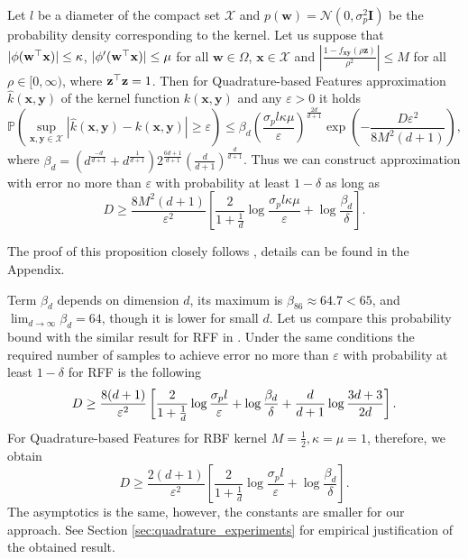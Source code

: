 \begin{proposition}
\label{prop:error_probability_bound}
Let $l$ be a diameter of the compact set $\mathcal{X}$ and
$p(\mathbf{w}) = \mathcal{N}(0, \sigma_p^2 \mathbf{I})$ be the probability density
corresponding to the kernel.
Let us suppose that $|\phi(\mathbf{w}^{\top}\mathbf{x})| \leq \kappa$,
$|\phi'(\mathbf{w}^{\top} \mathbf{x})| \leq \mu$ for all $\mathbf{w} \in \Omega$,
$\mathbf{x} \in \mathcal{X}$ and
$\left |\frac{1 - f_{\mathbf{xy}}(\rho \mathbf{z})}{\rho^2} \right | \leq M$ for all $\rho \in [0, \infty)$, where $\mathbf{z}^{\top}\mathbf{z} = 1$.
Then for Quadrature-based Features approximation $\hat{k}(\mathbf{x}, \mathbf{y})$ of the kernel function
$k(\mathbf{x}, \mathbf{y})$ and any $\varepsilon > 0$ it holds
\[
\mathbb{P} \left ( \sup_{\mathbf{x}, \mathbf{y} \in \mathcal{X}}|
\hat{k}(\mathbf{x}, \mathbf{y}) - k(\mathbf{x}, \mathbf{y})| \geq \varepsilon \right ) \leq
\beta_d
\left ( \frac{\sigma_p l \kappa \mu}{\varepsilon} \right )^{\frac{2d}{d + 1}}
\exp \left ( -\frac{D\varepsilon^2}{8M^2(d + 1)} \right ),
\]
where $\beta_d = \left (d^{\frac{-d}{d + 1}} + d^{\frac{1}{d + 1}}\right ) 2^\frac{6d + 1}{d + 1}
\left ( \frac{d}{d + 1} \right)^{\frac{d}{d + 1}}$.
Thus we can construct approximation with error no more than $\varepsilon$ with probability at least
$1 - \delta$ as long as
\[
D \geq \frac{8M^2(d + 1)}{\varepsilon^2} \left [
\frac{2}{1 + \frac{1}{d}}\log \frac{\sigma_p l \kappa \mu}{\varepsilon} + \log \frac{\beta_d}{\delta}
\right ].
\]
\end{proposition}
The proof of this proposition closely follows \citep{sutherland2015error}, details can be found in the
Appendix.

Term $\beta_d$ depends on dimension $d$, its maximum is $\beta_{86} \approx 64.7 < 65$,
and $\lim_{d \rightarrow \infty} \beta_d = 64$, though it is lower for small $d$.
Let us compare this probability bound with the similar result for RFF in
\citep{sutherland2015error}. Under the same conditions the required number of samples to achieve error
no more than $\varepsilon$ with probability at least $1 - \delta$ for RFF is the following
\begin{align*}
D \geq \frac{8(d + 1)}{\varepsilon^2} \left [
\vphantom{\frac{2}{1 + \frac{1}{d}}\log \frac{\sigma_p l}{\varepsilon}}
\frac{2}{1 + \frac{1}{d}}\log \frac{\sigma_p l}{\varepsilon} + \log \frac{\beta_d}{\delta} + \frac{d}{d + 1}\log \frac{3d + 3}{2d}
\right ].
\end{align*}
For Quadrature-based Features for RBF kernel $M = \frac12, \kappa = \mu = 1$, therefore, we obtain
\[
D \geq \frac{2(d + 1)}{\varepsilon^2} \left [
\frac{2}{1 + \frac{1}{d}}\log \frac{\sigma_p l}{\varepsilon} + \log \frac{\beta_d}{\delta}
\right ] .
\]
The asymptotics is the same, however, the constants are smaller for our approach. See Section \ref{sec:quadrature_experiments} for empirical justification
of the obtained result.

